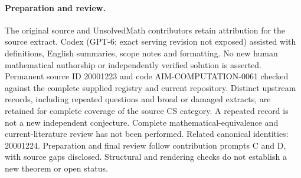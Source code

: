 \documentclass[11pt]{article}
\begin{document}
\paragraph{Preparation and review.}
The original source and UnsolvedMath contributors retain attribution for the source extract. Codex (GPT-6; exact serving revision not exposed) assisted with definitions, English summaries, scope notes and formatting. No new human mathematical authorship or independently verified solution is asserted. Permanent source ID 20001223 and code AIM-COMPUTATION-0061 checked against the complete supplied registry and current repository. Distinct upstream records, including repeated questions and broad or damaged extracts, are retained for complete coverage of the source CS category. A repeated record is not a new independent conjecture. Complete mathematical-equivalence and current-literature review has not been performed. Related canonical identities: 20001224. Preparation and final review follow contribution prompts C and D, with source gaps disclosed. Structural and rendering checks do not establish a new theorem or open status.
\label{end:20001223}
\end{document}
